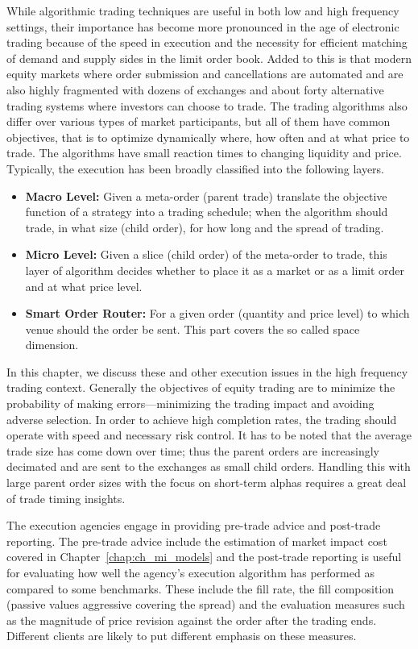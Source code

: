 While algorithmic trading techniques are useful in both low and high frequency settings, their importance has become more pronounced in the age of electronic trading because of the speed in execution and the necessity for efficient matching of demand and supply sides in the limit order book. Added to this is that modern equity markets where order submission and cancellations are automated and are also highly fragmented with dozens of exchanges and about forty alternative trading systems where investors can choose to trade. The trading algorithms also differ over various types of market participants, but all of them have common objectives, that is to optimize dynamically where, how often and at what price to trade. The algorithms have small reaction times to changing liquidity and price. Typically, the execution has been broadly classified into the following layers.
	\begin{itemize}
	\item \textbf{Macro Level:} Given a meta-order (parent trade) translate the objective function of a strategy into a trading schedule; when the algorithm should trade, in what size (child order), for how long and the spread of trading.
	
	\item \textbf{Micro Level:} Given a slice (child order) of the meta-order to trade, this layer of algorithm decides whether to place it as a market or as a  limit order and at what price level.
	
	\item \textbf{Smart Order Router:} For a given order (quantity and price level) to which venue should the order be sent. This part covers the so called space dimension.
	\end{itemize}


In this chapter, we discuss these and other execution issues in the high frequency trading context. Generally the objectives of equity trading are to minimize the probability of making errors---minimizing the trading impact and avoiding adverse selection. In order to achieve high completion rates, the trading should operate with speed and necessary risk control. It has to be noted that the average trade size has come down over time; thus the parent orders are increasingly decimated and are sent to the exchanges as small child orders. Handling this with large parent order sizes with the focus on short-term alphas requires a great deal of trade timing insights.  


The execution agencies engage in providing pre-trade advice and post-trade reporting. The pre-trade advice include the estimation of market impact cost covered in Chapter~\ref{chap:ch_mi_models} and the post-trade reporting is useful for evaluating how well the agency's execution algorithm has performed as compared to some benchmarks. These include the fill rate, the fill composition (passive values aggressive covering the spread) and the evaluation measures such as the magnitude of price revision against the order after the trading ends. Different clients are likely to put different emphasis on these measures. 


